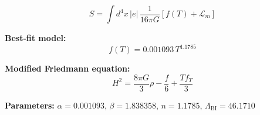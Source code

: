 
\begin{equation}
  S = \int d^4x \, |e| \, \frac{1}{16\pi G} \left[ f(T) + \mathcal{L}_m \right]
\end{equation}

\textbf{Best-fit model:}
\begin{equation}
  f(T) = 0.001093 \, T^{1.1785}
\end{equation}

\textbf{Modified Friedmann equation:}
\begin{equation}
  H^2 = \frac{8\pi G}{3} \rho - \frac{f}{6} + \frac{T f_T}{3}
\end{equation}

\textbf{Parameters:}
$\alpha = 0.001093$, \quad
$\beta = 1.838358$, \quad
$n = 1.1785$, \quad
$\Lambda_{\text{BI}} = 46.1710$